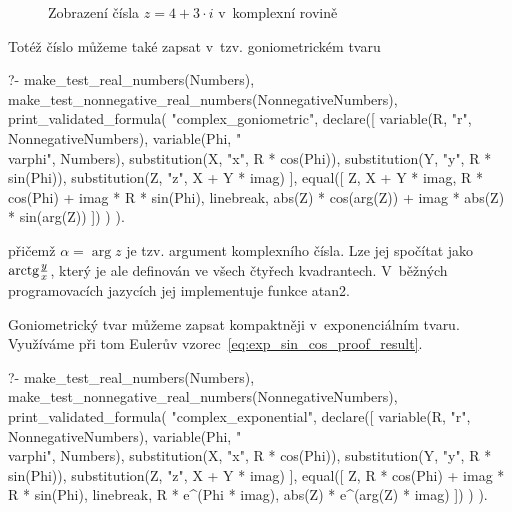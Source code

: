 \begin{figure}[ht]
\begin{center}
\caption{Zobrazení čísla \(z = 4 + 3 \cdot i\) v~komplexní rovině}
\label{img:complex_plane}
\end{center}
\end{figure}

Totéž číslo můžeme také zapsat v~tzv. goniometrickém tvaru

\begin{prolog}
?-	make_test_real_numbers(Numbers),
	make_test_nonnegative_real_numbers(NonnegativeNumbers),
	print_validated_formula(
		"complex_goniometric",
		declare([
			variable(R, "r", NonnegativeNumbers),
			variable(Phi, "\\varphi", Numbers),
			substitution(X, "x", R * cos(Phi)),
			substitution(Y, "y", R * sin(Phi)),
			substitution(Z, "z", X + Y * imag)
		],
			equal([
				Z,
				X + Y * imag,
				R * cos(Phi) + imag * R * sin(Phi),
				linebreak,
				abs(Z) * cos(arg(Z)) + imag * abs(Z) * sin(arg(Z))
			])
		)
	).
\end{prolog}

přičemž \(\alpha = \arg z\) je tzv. argument komplexního čísla. Lze jej spočítat jako \(\mathrm{arctg} \frac{y}{x}\), který je ale definován ve všech čtyřech kvadrantech. V~běžných programovacích jazycích jej implementuje funkce atan2.

Goniometrický tvar můžeme zapsat kompaktněji v~exponenciálním tvaru. Využíváme při tom Eulerův vzorec~\eqref{eq:exp_sin_cos_proof_result}.


\begin{prolog}
?-	make_test_real_numbers(Numbers),
	make_test_nonnegative_real_numbers(NonnegativeNumbers),
	print_validated_formula(
		"complex_exponential",
		declare([
			variable(R, "r", NonnegativeNumbers),
			variable(Phi, "\\varphi", Numbers),
			substitution(X, "x", R * cos(Phi)),
			substitution(Y, "y", R * sin(Phi)),
			substitution(Z, "z", X + Y * imag)
		],
			equal([
				Z,
				R * cos(Phi) + imag * R * sin(Phi),
				linebreak,
				R * e^(Phi * imag),
				abs(Z) * e^(arg(Z) * imag)
			])
		)
	).
\end{prolog}

